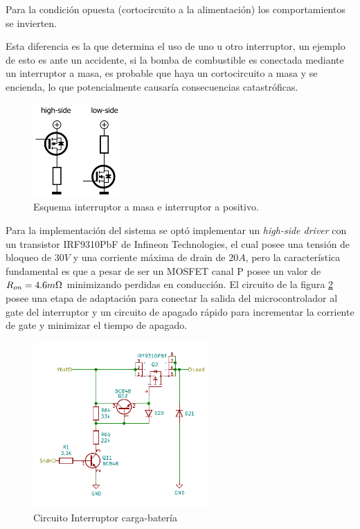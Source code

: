 \documentclass[10pt,a4paper]{article}
\begin{document}
\begin{itemize}
Para la condición opuesta (cortocircuito a la alimentación) los comportamientos
se invierten.

Esta diferencia es la que determina el uso de uno u otro interruptor, un ejemplo
de esto es ante un accidente, si la bomba de combustible es conectada mediante
un interruptor a masa, es probable que haya un cortocircuito a masa y se
encienda, lo que potencialmente causaría consecuencias catastróficas.

\begin{figure}[h!]
	\begin{center}
		\includegraphics[width=0.30\textwidth]{low_high_driver_sch.png}
		\caption{Esquema interruptor a masa e interruptor a positivo.}
		\label{low_high_driver_sch}
	\end{center}
\end{figure}
\FloatBarrier

Para la implementación del sistema se optó implementar un \emph{high-side
driver} con un transistor IRF9310PbF de Infineon Technologies, el cual posee una
tensión de bloqueo de $30V$ y una corriente máxima de drain de $20A$, pero la
característica fundamental es que a pesar de ser un MOSFET canal P posee un
valor de $R_{on}=4.6 m\ohm$ minimizando perdidas en conducción. El circuito de
la figura \ref{load_sw_sch} posee una etapa de adaptación para conectar la
salida del microcontrolador al gate del interruptor y un circuito de apagado
rápido para incrementar la corriente de gate y minimizar el tiempo de apagado.

\begin{figure}[h!]
	\begin{center}
		\includegraphics[width=0.6\textwidth]{kcd_bat_load_switch.pdf}
		\caption{Circuito Interruptor carga-batería}
		\label{load_sw_sch}
	\end{center}
\end{figure}
\FloatBarrier


\end{itemize}
\end{document}
